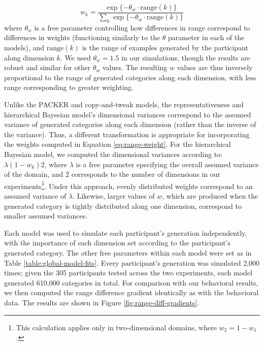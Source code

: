 \documentclass[12pt]{article}
\begin{document}
\begin{flushleft}
\begin{equation} w_k = \dfrac {\exp{ \{ -\theta_w \cdot\text{range}(k)} \} } {
\sum_k {\exp{ \{ -\theta_w \cdot\text{range}(k)} \} } }
\label{eq:range-weight}
\end{equation}
% 
where $\theta_w$ is a free parameter controlling how differences in range
correspond to differences in weights (functioning similarly to the $\theta$
parameter in each of the models), and $\text{range}(k)$ is the range of examples
generated by the participant along dimension $k$. We used $\theta_w = 1.5$ in
our simulations, though the results are robust and similar for other $\theta_w$
values. The resulting $w$ values are thus inversely proportional to the range of
generated categories along each dimension, with less range corresponding to
greater weighting.

Unlike the PACKER and copy-and-tweak models, the representativeness and
hierarchical Bayesian model's dimensional variances correspond to the assumed
variance of generated categories along each dimension (rather than the inverse
of the variance). Thus, a different transformation is appropriate for
incorporating the weights computed in Equation \ref{eq:range-weight}. For the
hierarchical Bayesian model, we computed the dimensional variances according to:
$\lambda (1-w_k) 2$, where $\lambda$ is a free parameter specifying the overall
assumed variance of the domain, and $2$ corresponds to the number of dimensions
in our experiments\footnote{This calculation applies only in two-dimensional
  domains, where $w_2 = 1-w_1$.}. Under this approach, evenly distributed
weights correspond to an assumed variance of $\lambda$. Likewise, larger values
of $w$, which are produced when the generated category is tightly distributed
along one dimension, correspond to smaller assumed variances.

Each model was used to simulate each participant's generation independently,
with the importance of each dimension set according to the participant's
generated category. The other free parameters within each model were set as in
Table \ref{table:global-model-fits}. Every participant's generation was
simulated 2,000 times; given the 305 participants tested across the two
experiments, each model generated 610,000 categories in total. For comparison
with our behavioral results, we then computed the range difference gradient
identically as with the behavioral data. The results are shown in Figure
\ref{fig:range-diff-gradients}.


\end{flushleft}
\end{document}
